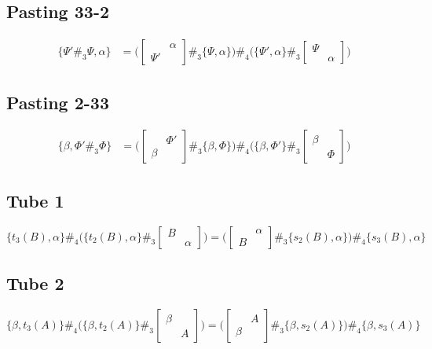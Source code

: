\documentclass[11pt, reqno]{amsart} %
\theoremstyle{definition}
\theoremstyle{remark}
\numberwithin{equation}{section}
\begin{document}
\subsection{Pasting 33-2}
\begin{align}
  \label{eq:Pasting332}
  \{\Psi'\#_3\Psi,\alpha\}
  &= 
  \bigl(
    \begin{bmatrix}& \alpha \\ \Psi' &\end{bmatrix}
    \#_3
    \{\Psi,\alpha\}
  \bigr) 
  \#_4
  \bigl(
    \{\Psi',\alpha\}
    \#_3
    \begin{bmatrix}\Psi & \\ & \alpha\end{bmatrix}
  \bigr)
\end{align}


\subsection{Pasting 2-33}
\begin{align}
  \label{eq:Pasting233}
  \{\beta,\Phi'\#_3\Phi\} &= 
  \bigl(
    \begin{bmatrix}& \Phi' \\ \beta &\end{bmatrix}
    \#_3
    \{\beta,\Phi\}
  \bigr)
  \#_4
  \bigl(
    \{\beta,\Phi'\}
    \#_3
    \begin{bmatrix}\beta & \\ & \Phi\end{bmatrix}
  \bigr)
\end{align}

\subsection{Tube 1}
\begin{equation}
  \label{eq:Tube1}
  \{t_3(B),\alpha\}\#_4\bigl(\{t_2(B),\alpha\}\#_3\begin{bmatrix}B & \\ &\alpha\end{bmatrix}\bigr) 
  = \bigl(\begin{bmatrix}& \alpha \\ B &\end{bmatrix}\#_3\{s_2(B),\alpha\}\bigr)\#_4\{s_3(B),\alpha\} 
\end{equation}

\subsection{Tube 2}
\begin{equation}
  \label{eq:Tube2}
  \{\beta,t_3(A)\}\#_4\bigl(\{\beta,t_2(A)\}\#_3\begin{bmatrix}\beta & \\ & A\end{bmatrix}\bigr) 
  = \bigl(\begin{bmatrix}& A \\ \beta &\end{bmatrix}\#_3\{\beta,s_2(A)\}\bigr)\#_4\{\beta,s_3(A)\} 
\end{equation}
\end{document}

